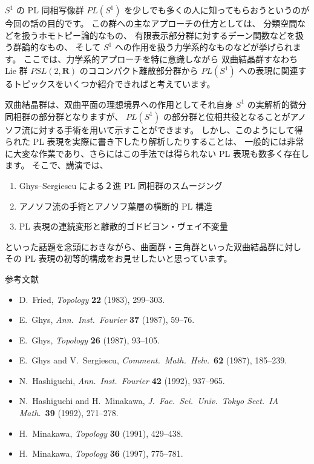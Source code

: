 \documentclass[uplatex,dvipdfmx]{jlreq}
\begin{document}
\medskip

$S^1$ の PL 同相写像群 $PL(S^1)$ を少しでも多くの人に知ってもらおうというのが今回の話の目的です。
この群への主なアプローチの仕方としては、
分類空間などを扱うホモトピー論的なもの、
有限表示部分群に対するデーン関数などを扱う群論的なもの、
そして $S^1$ への作用を扱う力学系的なものなどが挙げられます。
ここでは、力学系的アプローチを特に意識しながら
双曲結晶群すなわち Lie 群 $PSL(2,\mathbf{R})$ のココンパクト離散部分群から
$PL(S^1)$ への表現に関連するトピックスをいくつか紹介できればと考えています。

双曲結晶群は、双曲平面の理想境界への作用としてそれ自身 $S^1$ の実解析的微分同相群の部分群となりますが、
$PL(S^1)$ の部分群と位相共役となることがアノソフ流に対する手術を用いて示すことができます。
しかし、このようにして得られた PL 表現を実際に書き下したり解析したりすることは、
一般的には非常に大変な作業であり、さらにはこの手法では得られない PL 表現も数多く存在します。
そこで、講演では、
\begin{enumerate}
  \setlength{\itemsep}{2pt}
  \item[(1)] Ghys--Sergiescu による２進 PL 同相群のスムージング
  \item[(2)] アノソフ流の手術とアノソフ葉層の横断的 PL 構造
  \item[(3)] PL 表現の連続変形と離散的ゴドビヨン・ヴェイ不変量
\end{enumerate}
といった話題を念頭におきながら、曲面群・三角群といった双曲結晶群に対し
その PL 表現の初等的構成をお見せしたいと思っています。

\medskip

\begin{center}
  {\large 参考文献}
\end{center}

\begin{itemize}
  \setlength{\itemsep}{3pt}
  \item D.~Fried, \textit{Topology} \textbf{22} (1983), 299--303.
  \item E.~Ghys, \textit{Ann.\ Inst.\ Fourier} \textbf{37} (1987), 59--76.
  \item E.~Ghys, \textit{Topology} \textbf{26} (1987), 93--105.
  \item E.~Ghys and V.~Sergiescu,
        \textit{Comment.\ Math.\ Helv.}\ \textbf{62} (1987), 185--239.
  \item N.~Hashiguchi, \textit{Ann.\ Inst.\ Fourier} \textbf{42} (1992), 937--965.
  \item N.~Hashiguchi and H.~Minakawa,
        \textit{J.\ Fac.\ Sci.\ Univ.\ Tokyo Sect.\ IA Math.}\ \textbf{39} (1992), 271--278.
  \item H.~Minakawa, \textit{Topology} \textbf{30} (1991), 429--438.
  \item H.~Minakawa, \textit{Topology} \textbf{36} (1997), 775--781.
\end{itemize}
\end{document}
